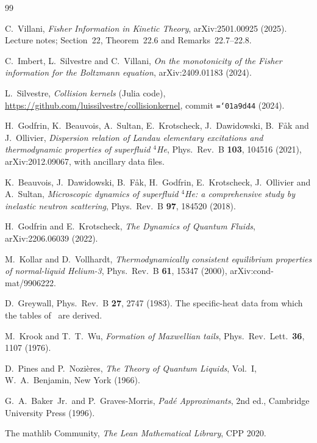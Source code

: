 \documentclass[11pt,a4paper,openany]{book}
\newcommand{\code}[1]{\texttt{\hyphenchar\font=`\-\relax #1}}
\theoremstyle{definition}
\theoremstyle{plain}
\begin{document}
\backmatter
\begin{thebibliography}{99}

C.~Villani, \emph{Fisher Information in Kinetic Theory}, arXiv:2501.00925 (2025). Lecture notes;
Section~22, Theorem~22.6 and Remarks~22.7--22.8.

C.~Imbert, L.~Silvestre and C.~Villani, \emph{On the monotonicity of the Fisher information for the
Boltzmann equation}, arXiv:2409.01183 (2024).

L.~Silvestre, \emph{Collision kernels} (Julia code),
\url{https://github.com/luissilvestre/collisionkernel}, commit \code{01a9d44} (2024).

H.~Godfrin, K.~Beauvois, A.~Sultan, E.~Krotscheck, J.~Dawidowski, B.~F\aa k and J.~Ollivier,
\emph{Dispersion relation of Landau elementary excitations and thermodynamic properties of
superfluid $^4$He}, Phys.\ Rev.\ B \textbf{103}, 104516 (2021), arXiv:2012.09067, with ancillary
data files.

K.~Beauvois, J.~Dawidowski, B.~F\aa k, H.~Godfrin, E.~Krotscheck, J.~Ollivier and A.~Sultan,
\emph{Microscopic dynamics of superfluid $^4$He: a comprehensive study by inelastic neutron
scattering}, Phys.\ Rev.\ B \textbf{97}, 184520 (2018).

H.~Godfrin and E.~Krotscheck, \emph{The Dynamics of Quantum Fluids}, arXiv:2206.06039 (2022).

M.~Kollar and D.~Vollhardt, \emph{Thermodynamically consistent equilibrium properties of
normal-liquid Helium-3}, Phys.\ Rev.\ B \textbf{61}, 15347 (2000), arXiv:cond-mat/9906222.

D.~Greywall, Phys.\ Rev.\ B \textbf{27}, 2747 (1983). The specific-heat data from which the tables
of~\cite{kollar2000} are derived.

M.~Krook and T.~T.~Wu, \emph{Formation of Maxwellian tails}, Phys.\ Rev.\ Lett.\ \textbf{36}, 1107
(1976).

D.~Pines and P.~Nozi\`eres, \emph{The Theory of Quantum Liquids}, Vol.~I, W.~A.~Benjamin, New York
(1966).

G.~A.~Baker~Jr.\ and P.~Graves-Morris, \emph{Pad\'e Approximants}, 2nd ed., Cambridge University
Press (1996).

The mathlib Community, \emph{The Lean Mathematical Library}, CPP 2020.

\end{thebibliography}
\end{document}
